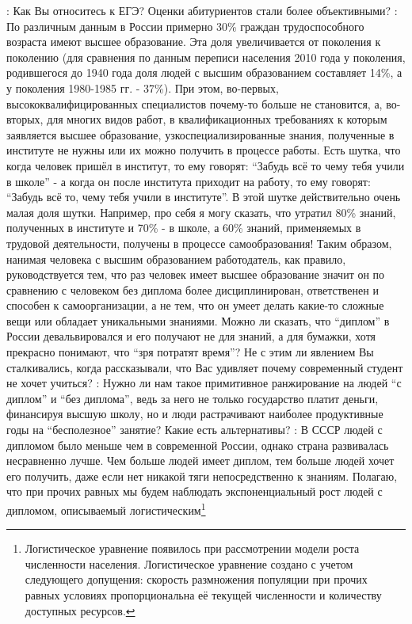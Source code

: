 \begin{drama}
	\maxspeaks: Как Вы относитесь к ЕГЭ? Оценки абитуриентов стали более объективными?
	\maxspeaks: По различным данным в России примерно 30\% граждан трудоспособного возраста имеют высшее образование. Эта доля увеличивается от поколения к поколению (для сравнения по данным переписи населения 2010 года у поколения, родившегося до 1940 года доля людей с высшим образованием составляет 14\%, а у поколения 1980-1985 гг. - 37\%). При этом, во-первых, высококвалифицированных специалистов почему-то больше не становится, а, во-вторых, для многих видов работ, в квалификационных требованиях к которым заявляется высшее образование, узкоспециализированные знания, полученные в институте не нужны или их можно получить в процессе работы. 
Есть шутка, что когда человек пришёл в институт, то ему говорят: “Забудь всё то чему тебя учили в школе” - а когда он после института приходит на работу, то ему говорят: “Забудь всё то, чему тебя учили в институте”. В этой шутке действительно очень малая доля шутки. Например, про себя я могу сказать, что утратил 80\% знаний, полученных в институте и 70\% - в школе, а 60\% знаний, применяемых в трудовой деятельности, получены в процессе самообразования!
Таким образом, нанимая человека с высшим образованием работодатель, как правило, руководствуется тем, что раз человек имеет высшее образование значит он по сравнению с человеком без диплома более дисциплинирован, ответственен и способен к самоорганизации, а не тем, что он умеет делать какие-то сложные вещи или обладает уникальными знаниями.
Можно ли сказать, что “диплом” в России девальвировался и его получают не для знаний, а для бумажки, хотя прекрасно понимают, что “зря потратят время”? Не с этим ли явлением Вы сталкивались, когда рассказывали, что Вас удивляет почему современный студент не хочет учиться? 
	\maxspeaks: Нужно ли нам такое примитивное ранжирование на людей “с диплом” и “без диплома”, ведь за него не только государство платит деньги, финансируя высшую школу, но и люди растрачивают наиболее продуктивные годы на “бесполезное” занятие? Какие есть альтернативы?
	\maxspeaks: В СССР людей с дипломом было меньше чем в современной России, однако страна развивалась несравненно лучше. Чем больше людей имеет диплом, тем больше людей хочет его получить, даже если нет никакой тяги непосредственно к знаниям. Полагаю, что при прочих равных мы будем наблюдать экспоненциальный рост людей с дипломом, описываемый логистическим\footnote{Логистическое уравнение появилось при рассмотрении модели роста численности населения. Логистическое уравнение создано с учетом следующего допущения: скорость размножения популяции при прочих равных условиях пропорциональна её текущей численности и  количеству доступных ресурсов.
}
\end{drama}
